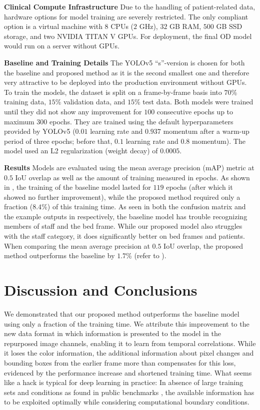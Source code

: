 \documentclass[conference]{IEEEtran}
\begin{document}
\noindent\textbf{Clinical Compute Infrastructure}
\label{sssec:ContextConstraintsInfrastructure}
Due to the handling of patient-related data, hardware options for model training are severely restricted.
The only compliant option is a virtual machine with $8$ CPUs ($2$ GHz), $32$ GB RAM, $500$ GB SSD storage, and two NVIDIA TITAN V GPUs.
For deployment, the final OD model would run on a server without GPUs.

\noindent\textbf{Baseline and Training Details}
\label{ssec:MethodBaseline}
The YOLOv5 ``s''-version is chosen for both the baseline and proposed method as it is the second smallest one and therefore very attractive to be deployed into the production environment without GPUs.
To train the models, the dataset is split on a frame-by-frame basis into $70$\% training data, $15$\% validation data, and $15$\% test data.
Both models were trained until they did not show any improvement for $100$ consecutive epochs up to maximum $300$ epochs.
They are trained using the default hyperparameters provided by YOLOv5 ($0.01$ learning rate and $0.937$ momentum after a warm-up period of three epochs; before that, $0.1$ learning rate and $0.8$ momentum).
The model used an L2 regularization (weight decay) of $0.0005$.

\noindent\textbf{Results}
Models are evaluated using the mean average precision (mAP) metric at $0.5$ IoU overlap as well as the amount of training measured in epochs.
As shown in , the training of the baseline model lasted for $119$ epochs (after which it showed no further improvement), while the proposed method required only a fraction ($8.4$\%) of this training time.
As seen in both the confusion matrix and the example outputs in  respectively, the baseline model has trouble recognizing members of staff and the bed frame.
While our proposed model also struggles with the staff category, it does significantly better on bed frames and patients.
When comparing the mean average precision at $0.5$ IoU overlap, the proposed method outperforms the baseline by $1.7$\% (refer to ).


\section{Discussion and Conclusions}

We demonstrated that our proposed method outperforms the baseline model using only a fraction of the training time.
We attribute this improvement to the new data format in which information is presented to the model in the repurposed image channels, enabling it to learn from temporal correlations.
While it loses the color information, the additional information about pixel changes and bounding boxes from the earlier frame more than compensates for this loss, evidenced by the performance increase and shortened training time.
What seems like a hack is typical for deep learning in practice:
In absence of large training sets and conditions as found in public benchmarks \cite{stadelmann2019beyond}, the available information has to be exploited optimally while considering computational boundary conditions.
\end{document}
